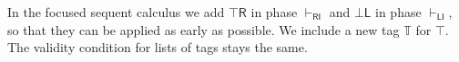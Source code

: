 \documentclass[submission,copyright,creativecommons]{eptcs}
\theoremstyle{definition}
\newcommand{\tr}{\otimes \mathsf{R}}
\newcommand{\andr}{\land \mathsf{R}}
\newcommand{\orl}{\lor \mathsf{L}}
\newcommand{\orrone}{\lor \mathsf{R}_{1}}
\newcommand{\orrtwo}{\lor \mathsf{R}_{2}}
\newcommand{\RI}{\mathsf{RI}}
\newcommand{\LI}{\mathsf{LI}}
\newcommand{\tT}{\mathbb{T}}
\newcommand{\topr}{\top \mathsf{R}}
\newcommand{\botl}{\bot \mathsf{L}}
\begin{document}
In the focused sequent calculus we add $\topr$ in phase $\vdash_\RI$ and $\botl$ in phase $\vdash_\LI$, so  that they can be applied as early as possible.
We include a new tag $\tT$ for $\top$. The validity condition for lists of tags stays the same.
\end{document}
